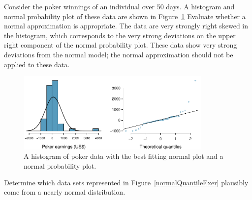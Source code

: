 \begin{examplewrap}
\begin{nexample}{Consider the poker winnings of an individual over 50 days. A histogram and normal probability plot of these data are shown in Figure~\ref{pokerNormal} Evaluate whether a normal approximation is appropriate.}
The data are very strongly right skewed in the histogram, which corresponds to the very strong deviations on the upper right component of the normal probability plot. These data show very strong deviations from the normal model; the normal approximation should not be applied to these data.
\end{nexample}
\end{examplewrap}

\begin{figure}[h]
	\centering
	\includegraphics[width=0.85\textwidth]{ch_distributions_oi_biostat/figures/pokerNormal/pokerNormal}
	\caption{A histogram of poker data with the best fitting normal plot and a normal probability plot.}
	\label{pokerNormal}
\end{figure}	

\begin{exercisewrap}
\begin{nexercise}\label{normalQuantileExercise}%
Determine which data sets represented in Figure~\ref{normalQuantileExer} plausibly come from a nearly normal distribution.\footnotemark{}
\end{nexercise}
\end{exercisewrap}


